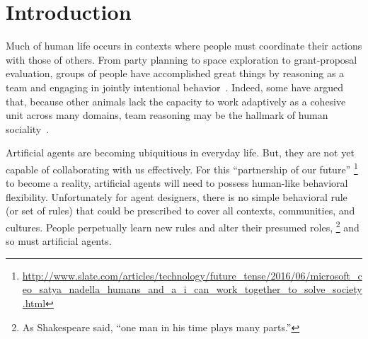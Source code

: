 
\section{Introduction}
\label{sec:intro}

Much of human life occurs in contexts where people must coordinate
their actions with those of others.  From party planning to space
exploration to grant-proposal evaluation, groups of people have
accomplished great things by reasoning as a team and engaging in
jointly intentional behavior~\cite{searle1995construction}.  Indeed,
some have argued that, because other animals lack the capacity to
work adaptively as a cohesive unit across many domains, team reasoning
may be the hallmark of human
sociality~\cite{tomasello2005understanding}.


Artificial agents are becoming ubiquitious in everyday life.  But, they
are not yet capable of collaborating with us effectively.  For this
``partnership of our future''%
\footnote{\url{http://www.slate.com/articles/technology/future_tense/2016/06/microsoft_ceo_satya_nadella_humans_and_a_i_can_work_together_to_solve_society.html}}
to become a reality, artificial agents will need to possess human-like
behavioral flexibility.  Unfortunately for agent designers, there is
no simple behavioral rule (or set of rules) that could be prescribed
to cover all contexts, communities, and cultures.  People perpetually
learn new rules and alter their presumed roles,%
\footnote{As Shakespeare said, ``one man in his time plays many parts.''}
and so must artificial agents.




